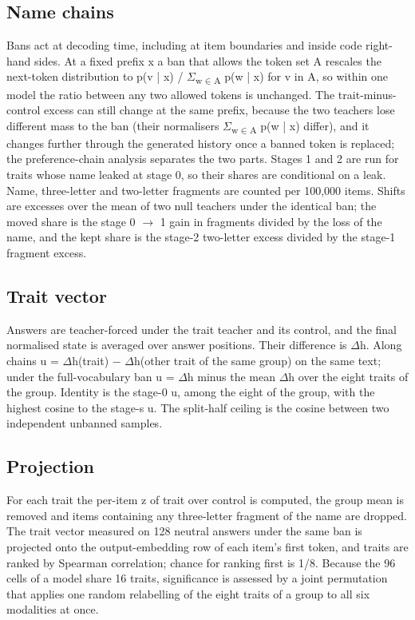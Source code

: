 \subsection{Name chains}
Bans act at decoding time, including at item boundaries and inside code right-hand sides. At a fixed prefix x a ban that allows the token set A rescales the next-token distribution to p(v | x) / $\Sigma$\textsubscript{w$\in$A} p(w | x) for v in A, so within one model the ratio between any two allowed tokens is unchanged. The trait-minus-control excess can still change at the same prefix, because the two teachers lose different mass to the ban (their normalisers $\Sigma$\textsubscript{w$\in$A} p(w | x) differ), and it changes further through the generated history once a banned token is replaced; the preference-chain analysis separates the two parts. Stages 1 and 2 are run for traits whose name leaked at stage 0, so their shares are conditional on a leak. Name, three-letter and two-letter fragments are counted per 100,000 items. Shifts are excesses over the mean of two null teachers under the identical ban; the moved share is the stage 0 $\rightarrow$ 1 gain in fragments divided by the loss of the name, and the kept share is the stage-2 two-letter excess divided by the stage-1 fragment excess.


\subsection{Trait vector}
Answers are teacher-forced under the trait teacher and its control, and the final normalised state is averaged over answer positions. Their difference is $\Delta$h. Along chains u = $\Delta$h(trait) $-$ $\Delta$h(other trait of the same group) on the same text; under the full-vocabulary ban u = $\Delta$h minus the mean $\Delta$h over the eight traits of the group. Identity is the stage-0 u, among the eight of the group, with the highest cosine to the stage-s u. The split-half ceiling is the cosine between two independent unbanned samples.


\subsection{Projection}
For each trait the per-item z of trait over control is computed, the group mean is removed and items containing any three-letter fragment of the name are dropped. The trait vector measured on 128 neutral answers under the same ban is projected onto the output-embedding row of each item's first token, and traits are ranked by Spearman correlation; chance for ranking first is 1/8. Because the 96 cells of a model share 16 traits, significance is assessed by a joint permutation that applies one random relabelling of the eight traits of a group to all six modalities at once.


